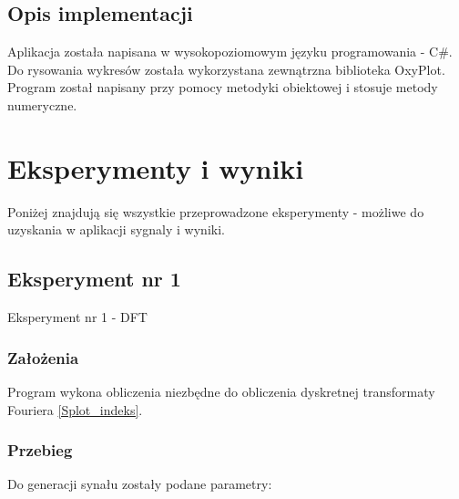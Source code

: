 \documentclass[12pt]{article}
\begin{document}
\subsection{Opis implementacji}
Aplikacja została napisana w wysokopoziomowym języku programowania - C\#. Do rysowania wykresów została wykorzystana zewnątrzna biblioteka OxyPlot. Program został napisany przy pomocy metodyki obiektowej i stosuje metody numeryczne.

\section{Eksperymenty i wyniki}

Poniżej znajdują się wszystkie przeprowadzone eksperymenty - możliwe do uzyskania w aplikacji sygnaly i wyniki. 


\subsection{Eksperyment nr 1}

Eksperyment nr 1 -  DFT\\


\subsubsection{Założenia}
Program wykona obliczenia niezbędne do obliczenia dyskretnej transformaty Fouriera \ref{Splot_indeks}.

\subsubsection{Przebieg}
Do generacji synału zostały podane parametry:
\end{document}
